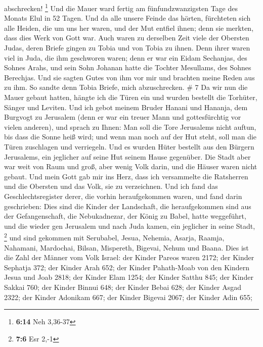 abschrecken! \footnote{\textbf{6:14} Neh 3,36-37}  Und
die Mauer ward fertig am fünfundzwanzigsten Tage des Monats Elul in 52
Tagen.  Und da alle unsere Feinde das hörten, fürchteten
sich alle Heiden, die um uns her waren, und der Mut entfiel ihnen; denn
sie merkten, dass dies Werk von Gott war.  Auch waren zu
derselben Zeit viele der Obersten Judas, deren Briefe gingen zu Tobia
und von Tobia zu ihnen.  Denn ihrer waren viel in Juda,
die ihm geschworen waren; denn er war ein Eidam Sechanjas, des Sohnes
Arahs, und sein Sohn Johanan hatte die Tochter Mesullams, des Sohnes
Berechjas.  Und sie sagten Gutes von ihm vor mir und
brachten meine Reden aus zu ihm. So sandte denn Tobia Briefe, mich
abzuschrecken. \# 7  Da wir nun die Mauer gebaut hatten,
hängte ich die Türen ein und wurden bestellt die Torhüter, Sänger und
Leviten.  Und ich gebot meinem Bruder Hanani und Hananja,
dem Burgvogt zu Jerusalem (denn er war ein treuer Mann und
gottesfürchtig vor vielen anderen),  und sprach zu Ihnen:
Man soll die Tore Jerusalems nicht auftun, bis dass die Sonne heiß wird;
und wenn man noch auf der Hut steht, soll man die Türen zuschlagen und
verriegeln. Und es wurden Hüter bestellt aus den Bürgern Jerusalems, ein
jeglicher auf seine Hut seinem Hause gegenüber.  Die Stadt
aber war weit von Raum und groß, aber wenig Volk darin, und die Häuser
waren nicht gebaut.  Und mein Gott gab mir ins Herz, dass
ich versammelte die Ratsherren und die Obersten und das Volk, sie zu
verzeichnen. Und ich fand das Geschlechtsregister derer, die vorhin
heraufgekommen waren, und fand darin geschrieben:  Dies
sind die Kinder der Landschaft, die heraufgekommen sind aus der
Gefangenschaft, die Nebukadnezar, der König zu Babel, hatte weggeführt,
und die wieder gen Jerusalem und nach Juda kamen, ein jeglicher in seine
Stadt, \footnote{\textbf{7:6} Esr 2,-1}  und sind gekommen
mit Serubabel, Jesua, Nehemia, Asarja, Raamja, Nahamani, Mardochai,
Bilsan, Mispereth, Bigevai, Nehum und Baana. Dies ist die Zahl der
Männer vom Volk Israel:  der Kinder Pareos waren 2172;
 der Kinder Sephatja 372;  der Kinder Arah
652;  der Kinder Pahath-Moab von den Kindern Jesua und
Joab 2818;  der Kinder Elam 1254;  der
Kinder Satthu 845;  der Kinder Sakkai 760;
 der Kinder Binnui 648;  der Kinder Bebai
628;  der Kinder Asgad 2322;  der Kinder
Adonikam 667;  der Kinder Bigevai 2067; 
der Kinder Adin 655;


